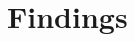 \documentclass[manuscript,review,anonymous]{acmart}
\begin{document}




\section{Findings}
\label{sec:findings}
\end{document}
